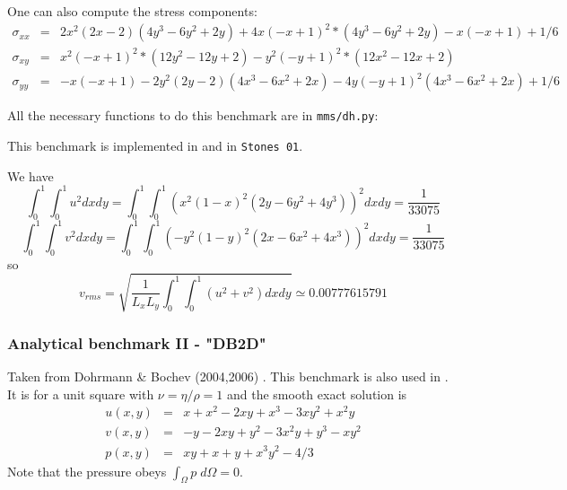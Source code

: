 One can also compute the stress components:
\begin{eqnarray}
\sigma_{xx} &=&  2x^2(2x - 2)(4y^3 - 6y^2 + 2y) + 4x(-x + 1)^2*(4y^3 - 6y^2 + 2y) - x(-x + 1) + 1/6 \\
\sigma_{xy} &=&  x^2(-x + 1)^2*(12y^2 - 12y + 2) - y^2(-y + 1)^2*(12x^2 - 12x + 2) \\
\sigma_{yy} &=&  -x(-x + 1) - 2y^2(2y - 2)(4x^3 - 6x^2 + 2x) - 4y(-y + 1)^2(4x^3 - 6x^2 + 2x) + 1/6
\end{eqnarray}

All the necessary functions to do this benchmark are in {\tt mms/dh.py}:


This benchmark is implemented in \aspect{} \cite{aspectmanual} and in {\tt Stones 01}.

We have
\[
\int_0^1 \int_0^1 u^2 dxdy=
\int_0^1 \int_0^1 ( x^2(1- x)^2 (2y - 6y^2 + 4y^3)  )^2 dx dy = \frac{1}{33075}
\]
\[
\int_0^1 \int_0^1 v^2 dxdy=
\int_0^1 \int_0^1 ( -y^2 (1 - y)^2 (2x - 6x^2 + 4x^3) )^2 dx dy = \frac{1}{33075}
\]
so 
\[
v_{rms} = \sqrt{ \frac{1}{L_x L_y}  \int_0^1 \int_0^1 (u^2+v^2) dx dy } \simeq 0.00777615791
\]



\subsubsection{Analytical benchmark II \label{ss:mms2} - "DB2D"}

Taken from Dohrmann \& Bochev (2004,2006) \cite{dobo04,bodg06}. 
This benchmark is also used in \cite{wosp14,lami17}.
It is for a unit square with $\nu=\eta/\rho=1$ and the smooth exact solution is
\begin{eqnarray}
u(x,y) &=& x+x^2 - 2xy+x^3 - 3xy^2 + x^2y \\
v(x,y) &=& -y-2xy+y^2 -3x^2y + y^3 - xy^2 \\
p(x,y) &=& xy+x+y+x^3y^2 - 4/3
\end{eqnarray}
Note that the pressure obeys $\int_{\Omega} p \; d\Omega = 0$.

